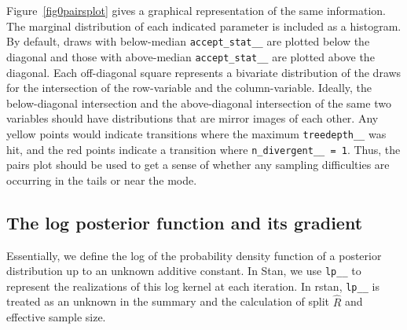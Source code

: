 \documentclass[12pt]{article}
\newcommand{\Stan}{Stan\xspace}
\newcommand{\code}[1]{{\tt #1}}
\newcommand{\strong}[1]{\texorpdfstring%
          {{\normalfont\fontseries{b}\selectfont #1}}%
            {#1}}
\let\pkg=\strong
\begin{document}
                Figure~\ref{fig0pairsplot} gives a graphical representation of the same information.
                The marginal distribution of each indicated parameter is included as a histogram.
                By default, draws with below-median \code{accept\_stat\_\_} are plotted below the
                diagonal and those with above-median \code{accept\_stat\_\_} are plotted above the
                diagonal. Each off-diagonal square represents a bivariate distribution of the draws for the 
                intersection of the row-variable and the column-variable. Ideally, the below-diagonal
                intersection and the above-diagonal intersection of the same two variables should
                have distributions that are mirror images of each other. Any yellow points would indicate
                transitions where the maximum \code{treedepth\_\_} was hit, and the red points indicate
                a transition where \code{n\_divergent\_\_ = 1}. Thus, the pairs plot should be used
                to get a sense of whether any sampling difficulties are occurring in the tails or
                near the mode.
                
                \subsection{The log posterior function and its gradient} 
                
                Essentially, we define the log of the probability
                density function of a posterior distribution up to an unknown additive constant.
                In \Stan, we use \code{lp\_\_} to represent the realizations of this log kernel at 
                each iteration.   In \pkg{rstan}, \code{lp\_\_} is treated as an unknown
                in the summary and the calculation of split $\hat{R}$ and effective sample size.
                
\end{document}
